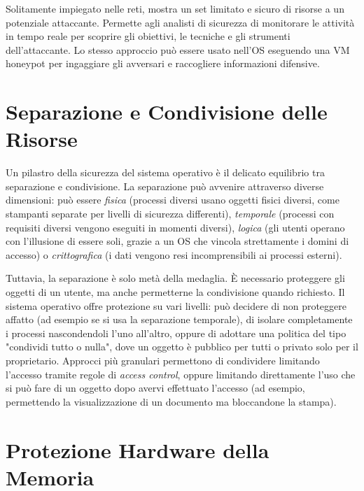 \documentclass{article}
\begin{document}
Solitamente impiegato nelle reti, mostra un set limitato e sicuro di risorse a un potenziale attaccante. Permette agli analisti di sicurezza di monitorare le attività in tempo reale per scoprire gli obiettivi, le tecniche e gli strumenti dell'attaccante. Lo stesso approccio può essere usato nell'OS eseguendo una VM honeypot per ingaggiare gli avversari e raccogliere informazioni difensive.

\vspace{0.8cm}

\section*{Separazione e Condivisione delle Risorse}

Un pilastro della sicurezza del sistema operativo è il delicato equilibrio tra separazione e condivisione. La separazione può avvenire attraverso diverse dimensioni: può essere \textit{fisica} (processi diversi usano oggetti fisici diversi, come stampanti separate per livelli di sicurezza differenti), \textit{temporale} (processi con requisiti diversi vengono eseguiti in momenti diversi), \textit{logica} (gli utenti operano con l'illusione di essere soli, grazie a un OS che vincola strettamente i domini di accesso) o \textit{crittografica} (i dati vengono resi incomprensibili ai processi esterni).

Tuttavia, la separazione è solo metà della medaglia. È necessario proteggere gli oggetti di un utente, ma anche permetterne la condivisione quando richiesto. Il sistema operativo offre protezione su vari livelli: può decidere di non proteggere affatto (ad esempio se si usa la separazione temporale), di isolare completamente i processi nascondendoli l'uno all'altro, oppure di adottare una politica del tipo "condividi tutto o nulla", dove un oggetto è pubblico per tutti o privato solo per il proprietario. Approcci più granulari permettono di condividere limitando l'accesso tramite regole di \textit{access control}, oppure limitando direttamente l'uso che si può fare di un oggetto dopo avervi effettuato l'accesso (ad esempio, permettendo la visualizzazione di un documento ma bloccandone la stampa).

\vspace{0.8cm}

\section*{Protezione Hardware della Memoria}
\end{document}
